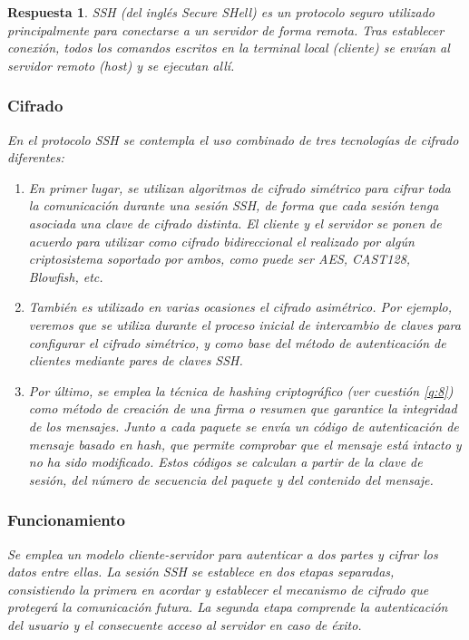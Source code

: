 \documentclass[
  a4paper,
  spanish,
  12pt,
]{scrartcl}
\theoremstyle{ejercicio-style}
\theoremstyle{remark-style}
\newtheorem*{sol}{Respuesta}
\theoremstyle{teorema-style}
\begin{document}
\begin{sol}
  SSH (del inglés \textit{Secure SHell}) es un protocolo seguro utilizado principalmente para conectarse a un servidor de forma remota. Tras establecer conexión, todos los comandos escritos en la terminal local (\textit{cliente}) se envían al servidor remoto (\textit{host}) y se ejecutan allí.

  \subsubsection*{Cifrado}
  En el protocolo SSH se contempla el uso combinado de tres tecnologías de cifrado diferentes:
  \begin{enumerate}
  \item En primer lugar, se utilizan algoritmos de \textit{cifrado simétrico} para cifrar toda la comunicación durante una sesión SSH, de forma que cada sesión tenga asociada una clave de cifrado distinta. El cliente y el servidor se ponen de acuerdo para utilizar como cifrado bidireccional el realizado por algún criptosistema soportado por ambos, como puede ser AES, CAST128, Blowfish, etc.
  \item También es utilizado en varias ocasiones el \textit{cifrado asimétrico}. Por ejemplo, veremos que se utiliza durante el proceso inicial de intercambio de claves para configurar el cifrado simétrico, y como base del método de autenticación de clientes mediante pares de claves SSH.
  \item Por último, se emplea la técnica de \textit{hashing criptográfico} (ver cuestión \ref{q:8}) como método de creación de una firma o resumen que garantice la integridad de los mensajes. Junto a cada paquete se envía un \textit{código de autenticación de mensaje basado en hash}, que permite comprobar que el mensaje está intacto y no ha sido modificado. Estos códigos se calculan a partir de la clave de sesión, del número de secuencia del paquete y del contenido del mensaje.
  \end{enumerate}

  \subsubsection*{Funcionamiento}

  Se emplea un modelo cliente-servidor para autenticar a dos partes y cifrar los datos entre ellas. La sesión SSH se establece en dos etapas separadas, consistiendo la primera en acordar y establecer el mecanismo de cifrado que protegerá la comunicación futura. La segunda etapa comprende la autenticación del usuario y el consecuente acceso al servidor en caso de éxito.


\end{sol}
\end{document}
